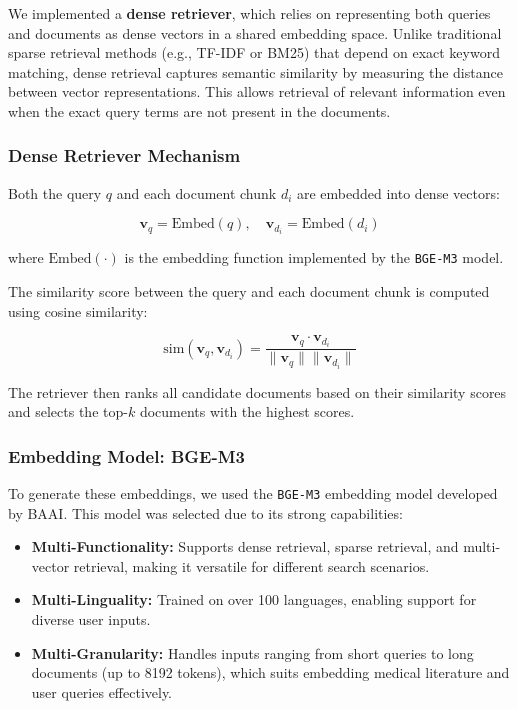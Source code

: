 We implemented a \textbf{dense retriever}, which relies on representing both queries and documents as dense vectors in a shared embedding space. Unlike traditional sparse retrieval methods (e.g., TF-IDF or BM25) that depend on exact keyword matching, dense retrieval captures semantic similarity by measuring the distance between vector representations. This allows retrieval of relevant information even when the exact query terms are not present in the documents.

\subsubsection*{Dense Retriever Mechanism}
Both the query $q$ and each document chunk $d_i$ are embedded into dense vectors:

\begin{equation*}
\mathbf{v}_q = \text{Embed}(q), \quad \mathbf{v}_{d_i} = \text{Embed}(d_i)
\end{equation*}

where $\text{Embed}(\cdot)$ is the embedding function implemented by the \texttt{BGE-M3} model.

The similarity score between the query and each document chunk is computed using cosine similarity:

\begin{equation*}
\text{sim}(\mathbf{v}_q, \mathbf{v}_{d_i}) = \frac{\mathbf{v}_q \cdot \mathbf{v}_{d_i}}{\|\mathbf{v}_q\| \|\mathbf{v}_{d_i}\|}
\end{equation*}

The retriever then ranks all candidate documents based on their similarity scores and selects the top-$k$ documents with the highest scores.

\subsubsection*{Embedding Model: BGE-M3}
To generate these embeddings, we used the \texttt{BGE-M3} embedding model developed by BAAI. This model was selected due to its strong capabilities:

\begin{itemize}
    \item \textbf{Multi-Functionality:} Supports dense retrieval, sparse retrieval, and multi-vector retrieval, making it versatile for different search scenarios.
    
    \item \textbf{Multi-Linguality:} Trained on over 100 languages, enabling support for diverse user inputs.
    
    \item \textbf{Multi-Granularity:} Handles inputs ranging from short queries to long documents (up to 8192 tokens), which suits embedding medical literature and user queries effectively.
\end{itemize}

